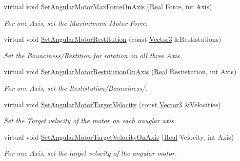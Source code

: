 \begin{DoxyCompactItemize}
virtual void \hyperlink{classphys_1_1Generic6DofConstraint_acea5d6e4ea817f44917bb8101bb78d33}{SetAngularMotorMaxForceOnAxis} (\hyperlink{namespacephys_af7eb897198d265b8e868f45240230d5f}{Real} Force, int Axis)
\begin{DoxyCompactList}\small\item\em For one Axis, set the Maximimum Motor Force. \item\end{DoxyCompactList}\item 
virtual void \hyperlink{classphys_1_1Generic6DofConstraint_aa345738f416fd160672881f8b6ce96c4}{SetAngularMotorRestitution} (const \hyperlink{classphys_1_1Vector3}{Vector3} \&Restistutions)
\begin{DoxyCompactList}\small\item\em Set the Bounciness/Restition for rotation on all three Axis. \item\end{DoxyCompactList}\item 
virtual void \hyperlink{classphys_1_1Generic6DofConstraint_af798448006c126df4abf6b819efa513c}{SetAngularMotorRestitutionOnAxis} (\hyperlink{namespacephys_af7eb897198d265b8e868f45240230d5f}{Real} Restistution, int Axis)
\begin{DoxyCompactList}\small\item\em For one Axis, set the Restistution/Bounciness/. \item\end{DoxyCompactList}\item 
virtual void \hyperlink{classphys_1_1Generic6DofConstraint_a45c2c3471d1498aaba83ec2d977dd43b}{SetAngularMotorTargetVelocity} (const \hyperlink{classphys_1_1Vector3}{Vector3} \&Velocities)
\begin{DoxyCompactList}\small\item\em Set the Target velocity of the motor on each anuglar axis. \item\end{DoxyCompactList}\item 
virtual void \hyperlink{classphys_1_1Generic6DofConstraint_a16623a2a275eca9038f47e9e933c594c}{SetAngularMotorTargetVelocityOnAxis} (\hyperlink{namespacephys_af7eb897198d265b8e868f45240230d5f}{Real} Velocity, int Axis)
\begin{DoxyCompactList}\small\item\em For one Axis, set the target velocity of the angular motor. \item\end{DoxyCompactList}\item 

\end{DoxyCompactItemize}
